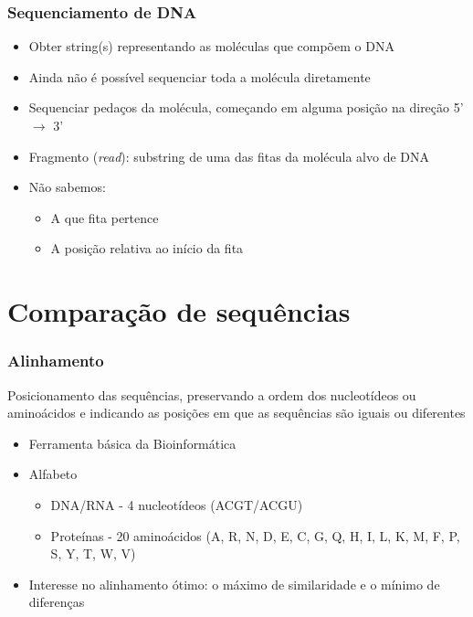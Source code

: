 \documentclass{beamer}
\begin{document}
		\begin{frame}\frametitle{Sequenciamento de DNA}
			\begin{itemize}
				\item Obter string(s) representando as moléculas que compõem o DNA
				\item Ainda não é possível sequenciar toda a molécula diretamente
				\item Sequenciar pedaços da molécula, começando em alguma posição na direção 5' $\rightarrow$ 3'
				\item Fragmento (\textit{read}): substring de uma das fitas da molécula alvo
				de DNA
				\item Não sabemos:
				\begin{itemize}
					\item A que fita pertence
					\item A posição relativa ao início da fita
				\end{itemize}
			\end{itemize}
		\end{frame}
		
	\section{Comparação de sequências}
		\begin{frame}\frametitle{Alinhamento}
			Posicionamento das sequências, preservando a ordem dos nucleotídeos ou aminoácidos e indicando as posições em que as sequências são iguais ou diferentes
			\begin{itemize}
				\item Ferramenta básica da Bioinformática
				\item Alfabeto
				\begin{itemize}
					\item DNA/RNA - 4 nucleotídeos (ACGT/ACGU)
					\item Proteínas - 20 aminoácidos (A, R, N, D, E, C, G, Q, H, I, L, K, M, F, P, S, Y, T, W, V)
				\end{itemize}
				\item Interesse no alinhamento ótimo: o máximo de similaridade e o mínimo de diferenças			
			\end{itemize}
		\end{frame}
	
\end{document}
